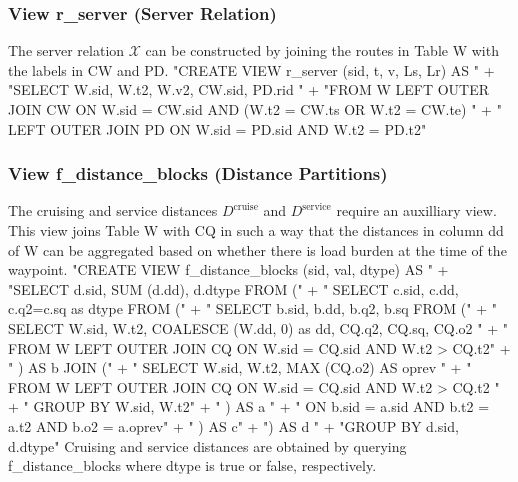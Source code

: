 \documentclass{article}
\def\nwendcode{\endtrivlist \endgroup}
\let\nwdocspar=\par
\theoremstyle{definition}
\begin{document}
\subsubsection{View r\_server (Server Relation)}
The server relation $\mathcal{X}$ can be constructed by joining the routes in
Table W with the labels in CW and PD.
\nwenddocs{}\endmoddef{}
"CREATE VIEW r_server (sid, t, v, Ls, Lr) AS "
  + "SELECT W.sid, W.t2, W.v2, CW.sid, PD.rid "
  + "FROM W LEFT OUTER JOIN CW ON W.sid = CW.sid AND (W.t2 = CW.ts OR W.t2 = CW.te) "
  + "  LEFT OUTER JOIN PD ON W.sid = PD.sid AND W.t2 = PD.t2"
\nwendcode{}\nwdocspar

\subsubsection{View f\_distance\_blocks (Distance Partitions)}
The cruising and service distances $D^\textrm{cruise}$ and $D^\textrm{service}$
require an auxilliary view. This view joins Table W with
CQ in such a way that the distances in column \textsf{dd} of W
can be aggregated based on whether there is load burden at the time of the
waypoint.
\nwenddocs{}\endmoddef{}
"CREATE VIEW f_distance_blocks (sid, val, dtype) AS "
  + "SELECT d.sid, SUM (d.dd), d.dtype FROM ("
  + "  SELECT c.sid, c.dd, c.q2=c.sq as dtype FROM ("
  + "    SELECT b.sid, b.dd, b.q2, b.sq FROM ("
  + "      SELECT W.sid, W.t2, COALESCE (W.dd, 0) as dd, CQ.q2, CQ.sq, CQ.o2 "
  + "      FROM W LEFT OUTER JOIN CQ ON W.sid = CQ.sid AND W.t2 > CQ.t2"
  + "    ) AS b JOIN ("
  + "      SELECT W.sid, W.t2, MAX (CQ.o2) AS oprev "
  + "      FROM W LEFT OUTER JOIN CQ ON W.sid = CQ.sid AND W.t2 > CQ.t2 "
  + "      GROUP BY W.sid, W.t2"
  + "    ) AS a "
  + "    ON b.sid = a.sid AND b.t2 = a.t2 AND b.o2 = a.oprev"
  + "  ) AS c"
  + ") AS d "
  + "GROUP BY d.sid, d.dtype"
\nwendcode{}Cruising and service distances are obtained by querying
f\_distance\_blocks where \textsf{dtype} is true or false, respectively.
\end{document}
